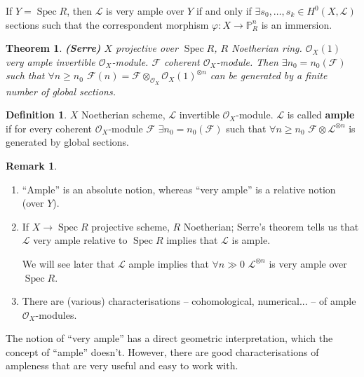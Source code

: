 \documentclass[12pt]{article}
\DeclareMathOperator{\Spec}{Spec}
\newtheorem*{theorem}{Theorem}
\theoremstyle{definition}
\newtheorem*{definition}{Definition}
\newtheorem*{remark}{Remark}
\begin{document}
If $Y=\Spec R$, then $\mathcal{L}$ is very ample over $Y$ if and only if $\exists s_0,\ldots,s_k\in H^0(X,\mathcal{L})$ sections such that the correspondent morphism $\varphi:X\rightarrow\mathbb{P}_R^n$ is an immersion.

\begin{theorem}
\emph{\textbf{(Serre)}} $X$ projective over $\Spec R$, $R$ Noetherian ring. $\mathcal{O}_X(1)$ very ample invertible $\mathcal{O}_X$-module. $\mathcal{F}$ coherent $\mathcal{O}_X$-module. Then $\exists n_0=n_0(\mathcal{F})$ such that $\forall n\geq n_0$ $\mathcal{F}(n)=\mathcal{F}\otimes_{\mathcal{O}_X}\mathcal{O}_X(1)^{\otimes n}$ can be generated by a finite number of global sections.
\end{theorem}

\begin{definition}
$X$ Noetherian scheme, $\mathcal{L}$ invertible $\mathcal{O}_X$-module. $\mathcal{L}$ is called \textbf{ample} if for every coherent $\mathcal{O}_X$-module $\mathcal{F}$ $\exists n_0=n_0(\mathcal{F})$ such that $\forall n\geq n_0$ $\mathcal{F}\otimes\mathcal{L}^{\otimes n}$ is generated by global sections.
\end{definition}

\begin{remark}
\begin{enumerate}[label=\arabic*)]
\item ``Ample'' is an absolute notion, whereas ``very ample'' is a relative notion (over $Y$).

\item If $X\rightarrow\Spec R$ projective scheme, $R$ Noetherian; Serre's theorem tells us that $\mathcal{L}$ very ample relative to $\Spec R$ implies that $\mathcal{L}$ is ample.

We will see later that $\mathcal{L}$ ample implies that $\forall n\gg0$ $\mathcal{L}^{\otimes n}$ is very ample over $\Spec R$.

\item There are (various) characterisations -- cohomological, numerical... -- of ample $\mathcal{O}_X$-modules.
\end{enumerate}
\end{remark}

The notion of ``very ample'' has a direct geometric interpretation, which the concept of ``ample'' doesn't. However, there are good characterisations of ampleness that are very useful and easy to work with.
\end{document}
